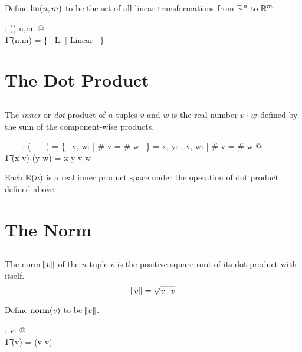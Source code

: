\documentclass[11pt, oneside]{article}
\begin{document}
\subsection{}

Define $\operatorname{lin}(n,m)$ to be the set of all linear transformations from $\mathbb{R}^n$ to $\mathbb{R}^m$.
\begin{axdef}
	\linR: \nat \cross \nat \fun \power(\Rinf \pfun \Rinf)
\where
	\forall n,m: \nat @ \\
	\t1	\linR(n,m) = \{~ L: \Rinf \pfun \Rinf | Linear ~\}
\end{axdef}

\section{The Dot Product}

\subsection{}

The {\it inner} or {\it dot} product of $n$-tuples $v$ and $w$ is the real number $v \mathbin{\cdot} w$ defined by the sum of the component-wise products.

\begin{axdef}
	\_ \dotR \_ : \Rinf \cross \Rinf \pfun \R
\where
	\dom(\_ \dotR \_) = \{~ v, w: \Rinf | \# v = \# w ~\}
\also
	\langle \rangle \dotR \langle \rangle = \zeroR
\also
	\forall x, y: \R; v, w: \Rinf | \# v = \# w @ \\
	\t1	(\langle x \rangle \cat v) \dotR (\langle y \rangle \cat w) = x \mulR y \addR v \dotR w
\end{axdef}

Each $\mathbb{R}(n)$ is a real inner product space under the operation of dot product defined above.

\section{The Norm}

\subsection{}

The norm $\norm{v}$ of the $n$-tuple $v$ is the positive square root of its dot product with itself.
$$
	\norm{v} = \sqrt{v \mathbin{\cdot} v}
$$

Define $\operatorname{norm}(v)$ to be $\norm{v}$.
\begin{axdef}
	\normR: \Rinf \fun \R
\where
	\forall v: \Rinf @ \\
	\t1	\normR(v) = \sqrtR(v \dotR v)
\end{axdef}
\end{document}
